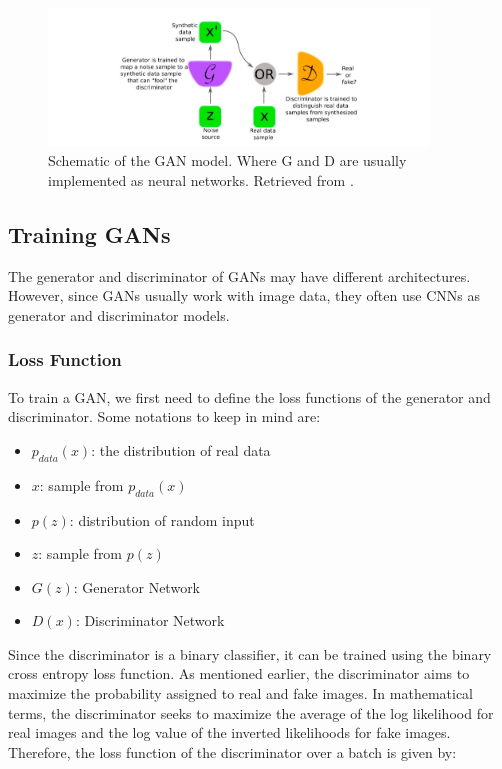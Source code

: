 \begin{figure}[!htb]
  \centering
  \includegraphics[width=0.90\textwidth]{Images/GAN.jpg}
  \caption[Schematic of the \ac{GAN} model. Where G and D are usually implemented as neural networks.]{Schematic of the \ac{GAN} model. Where G and D are usually implemented as neural networks. Retrieved from \cite{GAN}.}
  \label{GAN}
\end{figure}

\subsection{Training GANs}

The generator and discriminator of \ac{GANs} may have different architectures. However, since \ac{GANs} usually work with image data, they often use \ac{CNNs} as generator and discriminator models.

\subsubsection*{Loss Function}

To train a \ac{GAN}, we first need to define the loss functions of the generator and discriminator. Some notations to keep in mind are:

\begin{itemize}
    \item $p_{data}(x)$: the distribution of real data
    \item $x$: sample from $p_{data}(x)$
    \item $p(z)$: distribution of random input
    \item $z$: sample from $p(z)$
    \item $G(z)$: Generator Network
    \item $D(x)$: Discriminator Network
\end{itemize}

Since the discriminator is a binary classifier, it can be trained using the binary cross entropy loss function. As mentioned earlier, the discriminator aims to maximize the probability assigned to real and fake images. In mathematical terms, the discriminator seeks to maximize the average of the log likelihood for real images and the log value of the inverted likelihoods for fake images. Therefore, the loss function of the discriminator over a batch is given by:

